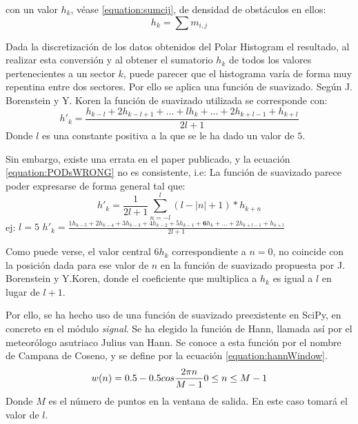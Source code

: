 con un valor $h_k$, véase \ref{equation:sumcij}, de densidad de obstáculos en ellos:
\begin{equation}
\label{equation:sumcij}
h_k = \sum m_{i,j}
\end{equation}

Dada la discretización de los datos obtenidos del Polar Histogram el resultado, al realizar esta conversión y al obtener el sumatorio $h_k$ de todos los valores pertenecientes a un sector $k$, puede parecer que el histograma varía de forma muy repentina entre dos sectores. Por ello se aplica una función de suavizado. 
Según J. Borenstein y Y. Koren la función de suavizado utilizada se corresponde con: 
\begin{equation}
\label{equation:PODsWRONG}
h'_k = \frac{h_{k-l} +2h_{k-l+1} + ... + lh_k + ... + 2h_{k+l-1} + h_{k+l}}{2l+1}
\end{equation}
Donde $l$  es una constante positiva a la que se le ha dado un valor de $5$. 

Sin embargo, existe una errata en el paper publicado, y la ecuación \ref{equation:PODsWRONG} no es consistente, i.e:
La función de suavizado parece poder expresarse de forma general tal que:
\begin{equation}
\label{equation:PODsWRONGgen}
h'_k =\frac{1}{2l+1} \sum_{n=-l}^{l} (l-  |n| +1)*h_{k+n}
\end{equation}
ej: $l = 5$ $ h'_k = \frac{1h_{k-5} +2h_{k-4} + 3h_{k-3} + 4h_{k-2} + 5h_{k-1} + \textbf{6}h_k + ... + 2h_{k+l-1} + h_{k+l}}{2l+1} $

Como puede verse, el valor central $ 6h_k $ correspondiente a $n=0$, no coincide con la posición dada para ese valor de $n$ en la función de suavizado propuesta por J. Borenstein y Y.Koren, donde el coeficiente que multiplica a $h_k$ es igual a $l$ en lugar de $l+1$.

Por ello, se ha hecho uso de una función de suavizado preexistente en SciPy, en concreto en el módulo \textit{signal}. Se ha elegido la función de Hann, llamada así por el meteorólogo asutriaco Julius van Hann. Se conoce a esta función por el nombre de Campana de Coseno, y se define por la ecuación \ref{equation:hannWindow}.
\begin{equation}
\label{equation:hannWindow}
w(n)=0.5 - 0.5 cos\frac{2 \pi n}{M-1}\\
0 \leq n \leq M-1
\end{equation}
Donde $M$ es el número de puntos en la ventana de salida. En este caso tomará el valor de $l$.

